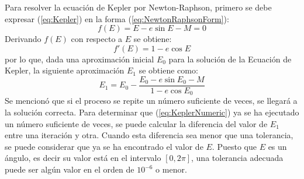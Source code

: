 \documentclass[a4paper,10pt]{article}
\begin{document}
Para resolver la ecuación de Kepler por Newton-Raphson, primero se debe expresar (\ref{eq:Kepler}) en la forma (\ref{eq:NewtonRaphsonForm}):
\[
  f(E) = E - e\sin E - M = 0
\]
Derivando $f(E)$ con respecto a $E$ se obtiene:
\[
  f'(E) = 1 - e\cos E
\]
por lo que, dada una aproximación inicial $E_0$ para la solución de la Ecuación de Kepler, la siguiente aproximación $E_1$ se obtiene como:
\begin{equation}
  E_1 = E_0 - \frac{E_0 - e\sin E_0 - M}{1 - e\cos E_0}
  \label{eq:KeplerNumeric}
\end{equation}
Se mencionó que si el proceso se repite un número suficiente de veces, se llegará a la solución correcta. Para determinar que (\ref{eq:KeplerNumeric}) ya se ha ejecutado un número suficiente de veces, se puede calcular la diferencia del valor de $E_1$ entre una iteración y otra. Cuando esta diferencia sea menor que una tolerancia, se puede considerar que ya se ha encontrado el valor de $E$. Puesto que $E$ es un ángulo, es decir su valor está en el intervalo  $[0, 2\pi]$, una tolerancia adecuada puede ser algún valor en el orden de $10^{-6}$ o menor.
\end{document}
